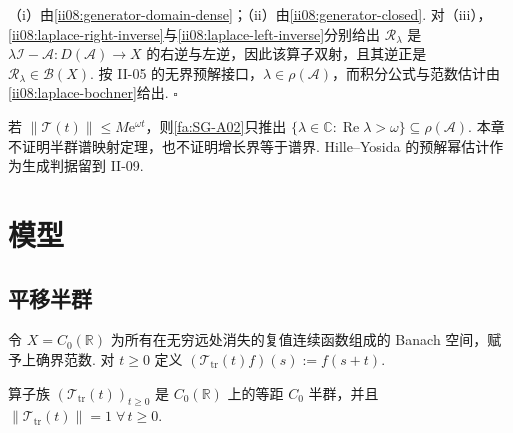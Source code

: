\begin{FAProof}
（i）由\autoref{ii08:generator-domain-dense}；（ii）由\autoref{ii08:generator-closed}. 对（iii），\autoref{ii08:laplace-right-inverse}与\autoref{ii08:laplace-left-inverse}分别给出 \(\displaystyle\mathcal R_\lambda\) 是 \(\displaystyle\lambda\mathcal I-\mathcal A:D(\mathcal A)\to X\) 的右逆与左逆，因此该算子双射，且其逆正是 \(\displaystyle\mathcal R_\lambda\in\mathcal B(X)\). 按 II-05 的无界预解接口，\(\displaystyle\lambda\in\rho(\mathcal A)\)，而积分公式与范数估计由\autoref{ii08:laplace-bochner}给出.
\hfill\(\square\)
\end{FAProof}

\begin{FARemark}[当前可得的谱边界]
若 \(\displaystyle\|\mathcal T(t)\|\leqslant M\mathrm{e}^{\omega t}\)，则\autoref{fa:SG-A02}只推出
\(\displaystyle \{\lambda\in\mathbb C:\operatorname{Re}\lambda>\omega\} \subseteq \rho(\mathcal A).\)
本章不证明半群谱映射定理，也不证明增长界等于谱界. Hille--Yosida 的预解幂估计作为生成判据留到 II-09.
\end{FARemark}

\section{模型}\label{sec:ii08-models}

\subsection{平移半群}

令 \(\displaystyle X=C_0(\mathbb R)\) 为所有在无穷远处消失的复值连续函数组成的 Banach 空间，赋予上确界范数. 对 \(\displaystyle t\geqslant0\) 定义
\(\displaystyle (\mathcal T_{\mathrm{tr}}(t)f)(s) := f(s+t).\)

\begin{FAExample}[等距 \(\displaystyle C_0\) 半群]\label{ii08:translation-semigroup}
算子族 \(\displaystyle(\mathcal T_{\mathrm{tr}}(t))_{t\geqslant0}\) 是 \(\displaystyle C_0(\mathbb R)\) 上的等距 \(\displaystyle C_0\) 半群，并且
\(\displaystyle \|\mathcal T_{\mathrm{tr}}(t)\|=1 \; \forall\,t\geqslant0.\)
\end{FAExample}


